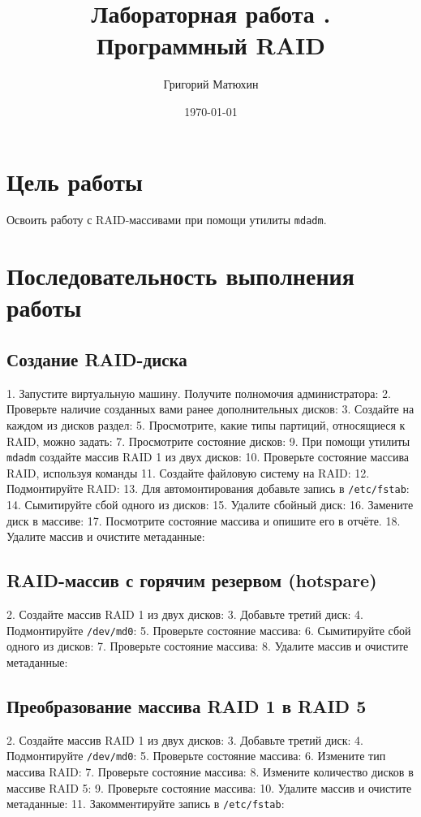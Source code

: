 \documentclass[12pt]{article}
\author{Григорий Матюхин}
\date{\today}
\title{Лабораторная работа \textnumero16.\\Программный RAID}
\begin{document}
\maketitle
\newpage
\tableofcontents
\newpage
\section{Цель работы}
Освоить работу с RAID-массивами при помощи утилиты \texttt{mdadm}.

\section{Последовательность выполнения работы}
\subsection{Создание RAID-диска}
\begin{enumerate}
	1. Запустите виртуальную машину. Получите полномочия администратора:
	2. Проверьте наличие созданных вами ранее дополнительных дисков:
	3. Создайте на каждом из дисков раздел:
	5. Просмотрите, какие типы партиций, относящиеся к RAID, можно задать:
	7. Просмотрите состояние дисков:
	9. При помощи утилиты \texttt{mdadm} создайте массив RAID 1 из двух дисков:
	10. Проверьте состояние массива RAID, используя команды
	11. Создайте файловую систему на RAID:
	12. Подмонтируйте RAID:
	13. Для автомонтирования добавьте запись в \texttt{/etc/fstab}:
	14. Сымитируйте сбой одного из дисков:
	15. Удалите сбойный диск:
	16. Замените диск в массиве:
	17. Посмотрите состояние массива и опишите его в отчёте.
	18. Удалите массив и очистите метаданные:
\end{enumerate}

\subsection{RAID-массив с горячим резервом (hotspare)}
\begin{enumerate}
	2. Создайте массив RAID 1 из двух дисков:
	3. Добавьте третий диск:
	4. Подмонтируйте \texttt{/dev/md0}:
	5. Проверьте состояние массива:
	6. Сымитируйте сбой одного из дисков:
	7. Проверьте состояние массива:
	8. Удалите массив и очистите метаданные:
\end{enumerate}

\subsection{Преобразование массива RAID 1 в RAID 5}
\begin{enumerate}
	2. Создайте массив RAID 1 из двух дисков:
	3. Добавьте третий диск:
	4. Подмонтируйте \texttt{/dev/md0}:
	5. Проверьте состояние массива:
	6. Измените тип массива RAID:
	7. Проверьте состояние массива:
	8. Измените количество дисков в массиве RAID 5:
	9. Проверьте состояние массива:
	10. Удалите массив и очистите метаданные:
	11. Закомментируйте запись в \texttt{/etc/fstab}:
\end{enumerate}
\end{document}
